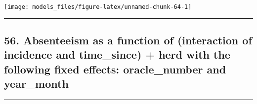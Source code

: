 \documentclass[]{article}
\begin{document}
\begin{center}\texttt{[image: models\_files/figure-latex/unnamed-chunk-64-1]} \end{center}

\newpage

\begin{center}\rule{0.5\linewidth}{\linethickness}\end{center}

\subsection{56. Absenteeism as a function of (interaction of incidence
and time\_since) + herd with the following fixed effects: oracle\_number
and
year\_month}\label{absenteeism-as-a-function-of-interaction-of-incidence-and-time_since-herd-with-the-following-fixed-effects-oracle_number-and-year_month}

\begin{center}\rule{0.5\linewidth}{\linethickness}\end{center}
\end{document}
